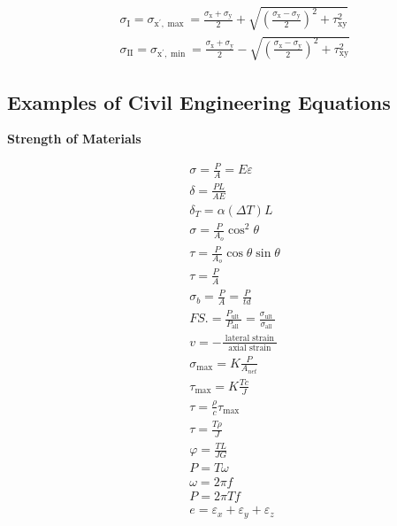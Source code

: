 \documentclass[10pt]{article}
\begin{document}
$$
\begin{aligned}
&\sigma_{\mathrm{I}}=\sigma_{\mathrm{x}^{\prime}, \max }=\frac{\sigma_{\mathrm{x}}+\sigma_{\mathrm{y}}}{2}+\sqrt{\left(\frac{\sigma_{\mathrm{x}}-\sigma_{\mathrm{y}}}{2}\right)^2+\tau_{\mathrm{xy}}^2} \\
&\sigma_{\mathrm{II}}=\sigma_{\mathrm{x}^{\prime}, \min }=\frac{\sigma_{\mathrm{x}}+\sigma_{\mathrm{y}}}{2}-\sqrt{\left(\frac{\sigma_{\mathrm{x}}-\sigma_{\mathrm{y}}}{2}\right)^2+\tau_{\mathrm{xy}}^2}
\end{aligned}
$$

\newpage

\subsection{Examples of Civil Engineering Equations}
\textbf{Strength of Materials}

$$
\begin{aligned}
&\sigma=\frac{P}{A}=E \varepsilon \\
&\delta=\frac{P L}{A E} \\
&\delta_T=\alpha(\Delta T) L \\
&\sigma=\frac{P}{A_o} \cos ^2 \theta \\
&\tau=\frac{P}{A_o} \cos \theta \sin \theta \\
&\tau=\frac{P}{A} \\
&\sigma_b=\frac{P}{A}=\frac{P}{t d} \\
&F S .=\frac{P_{\text {ult }}}{P_{\text {all }}}=\frac{\sigma_{\text {ult }}}{\sigma_{\text {all }}} \\
&v=-\frac{\text { lateral strain }}{\text { axial strain }} \\
&\sigma_{\max }=K \frac{P}{A_{n e t}} \\
&\tau_{\max }=K \frac{T c}{J} \\
&\tau=\frac{\rho}{c} \tau_{\max } \\
&\tau=\frac{T \rho}{J} \\
&\varphi=\frac{T L}{J G} \\
&P=T \omega \\
&\omega=2 \pi f \\
&P=2 \pi T f \\
&e=\varepsilon_x+\varepsilon_y+\varepsilon_z \\
&
\end{aligned}
$$
\end{document}
